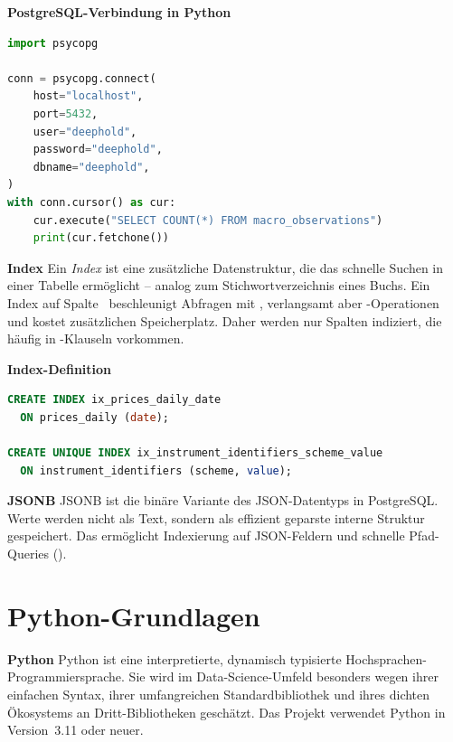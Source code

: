 \begin{beispiel}
\textbf{PostgreSQL-Verbindung in Python}
\begin{lstlisting}[language=python]
import psycopg

conn = psycopg.connect(
    host="localhost",
    port=5432,
    user="deephold",
    password="deephold",
    dbname="deephold",
)
with conn.cursor() as cur:
    cur.execute("SELECT COUNT(*) FROM macro_observations")
    print(cur.fetchone())
\end{lstlisting}
\end{beispiel}

\begin{definition}
\textbf{Index}
Ein \emph{Index} ist eine zusätzliche Datenstruktur, die das schnelle
Suchen in einer Tabelle ermöglicht -- analog zum Stichwortverzeichnis
eines Buchs. Ein Index auf Spalte~ beschleunigt Abfragen
mit , verlangsamt aber -Operationen
und kostet zusätzlichen Speicherplatz. Daher werden nur Spalten
indiziert, die häufig in -Klauseln vorkommen.
\end{definition}

\begin{beispiel}
\textbf{Index-Definition}
\begin{lstlisting}[language=sql]
CREATE INDEX ix_prices_daily_date
  ON prices_daily (date);

CREATE UNIQUE INDEX ix_instrument_identifiers_scheme_value
  ON instrument_identifiers (scheme, value);
\end{lstlisting}
\end{beispiel}

\begin{definition}
\textbf{JSONB}
JSONB ist die binäre Variante des JSON-Datentyps in PostgreSQL. Werte
werden nicht als Text, sondern als effizient geparste interne Struktur
gespeichert. Das ermöglicht Indexierung auf JSON-Feldern und
schnelle Pfad-Queries ().
\end{definition}

\section{Python-Grundlagen}

\begin{definition}
\textbf{Python}
Python ist eine interpretierte, dynamisch typisierte
Hochsprachen-Programmiersprache. Sie wird im Data-Science-Umfeld
besonders wegen ihrer einfachen Syntax, ihrer umfangreichen
Standardbibliothek und ihres dichten Ökosystems an
Dritt-Bibliotheken geschätzt. Das Projekt verwendet Python in
Version~3.11 oder neuer.
\end{definition}

